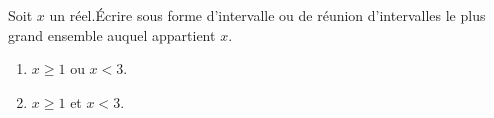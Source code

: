 
Soit $x$ un réel.Écrire sous forme d'intervalle ou de réunion d'intervalles le plus grand ensemble auquel appartient $x$.


\begin{enumerate}
	\item $x \geq 1$ ou $x<3$.
	\item $x \geq 1$ et $x<3$.
\end{enumerate}
